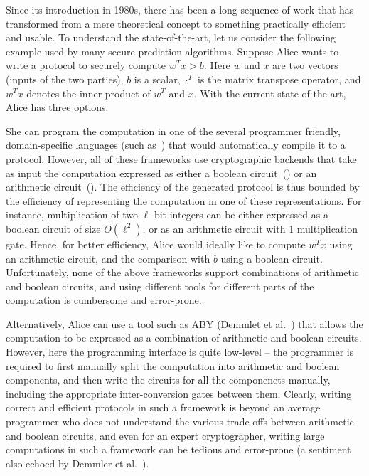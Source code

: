 Since its introduction in 1980s, there has been a long sequence
of work that has transformed \mpc from a mere theoretical concept to
something practically efficient and usable. To understand the
state-of-the-art, let us consider the following example used by many
secure prediction algorithms. Suppose Alice wants to write
a \mpc protocol to securely
compute $w^Tx >b$. Here $w$ and $x$ are two vectors (inputs of the two
parties), $b$ is a scalar, $\cdot^{T}$ is the matrix transpose
operator, and $w^Tx$ denotes the inner product of
$w^{T}$ and $x$.  With the current state-of-the-art, Alice has three
options:


She can program the computation in one of the several programmer
friendly, domain-specific languages (such
as~\cite{lambdaps,wysteria,oblivm,smcl,cbmcgc}) that would
automatically compile it to a \mpc protocol. However, all of these
frameworks use cryptographic backends that take as input
the computation expressed as either a boolean
circuit~(\cite{yao,gmw}) or an arithmetic circuit~(\cite{gentry}).
%
The efficiency of the generated \mpc protocol is thus bounded by the
efficiency of representing the computation in one of
these representations. For instance, multiplication of two
$\ell$-bit integers can be either expressed as a boolean circuit of
size $O(\ell^2)$, or as an arithmetic circuit with 1 multiplication
gate.
%
Hence, for better efficiency, Alice would ideally like to compute
$w^Tx$ using an arithmetic circuit, and the comparison with $b$ using
a boolean circuit.
%
Unfortunately, none of the above frameworks support combinations of
arithmetic and boolean circuits, and using different tools for
different parts of the computation is cumbersome and error-prone.



Alternatively, Alice can use a tool such as ABY (Demmlet et
al.~\cite{aby}) that allows
the computation to be expressed as a combination of arithmetic and
boolean circuits. However, here the programming interface is quite
low-level -- the programmer is required to first manually split the
computation into arithmetic and boolean components, and then write the
circuits for all the componenets manually, including the appropriate
inter-conversion gates between them. Clearly, writing correct
and efficient protocols in such a framework is beyond an average
programmer who does not understand the various trade-offs between
arithmetic and boolean circuits, and even for an expert cryptographer,
writing large computations in such a framework can be tedious and
error-prone (a sentiment also echoed by Demmler et al.~\cite{aby}).

